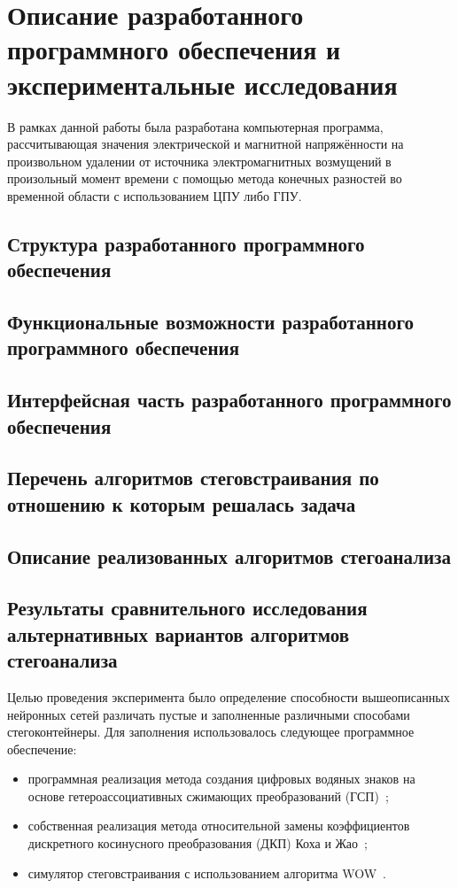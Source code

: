 
\section{Описание разработанного программного обеспечения и экспериментальные исследования}

В рамках данной работы была разработана компьютерная программа, рассчитывающая значения электрической и магнитной напряжённости на произвольном удалении от источника электромагнитных возмущений в произольный момент времени с помощью метода конечных разностей во временной области с использованием ЦПУ либо ГПУ.


\subsection{Структура разработанного программного обеспечения}
\subsection{Функциональные возможности разработанного программного обеспечения}
\subsection{Интерфейсная часть разработанного программного обеспечения}
\subsection{Перечень алгоритмов стеговстраивания по отношению к которым решалась задача}
\subsection{Описание реализованных алгоритмов стегоанализа}
\subsection{Результаты сравнительного исследования альтернативных вариантов алгоритмов стегоанализа}

Целью проведения эксперимента было определение способности вышеописанных нейронных сетей различать пустые и заполненные различными способами стегоконтейнеры. Для заполнения использовалось следующее программное обеспечение:

\begin{itemize}
\item программная реализация метода создания цифровых водяных знаков на основе гетероассоциативных сжимающих преобразований (ГСП)~\cite{SirotaHIC};
\item собственная реализация метода относительной замены коэффициентов дискретного косинусного преобразования (ДКП) Коха и Жао~\cite{ZhaoKoch, KochZhao};
\item симулятор стеговстраивания с использованием алгоритма WOW~\cite{WOW}.
\end{itemize}

